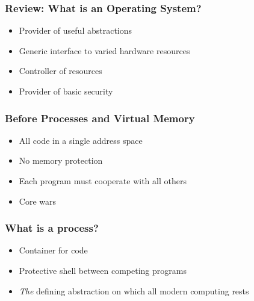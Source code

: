 \documentclass[pdftex]{beamer} %
\begin{document}
\begin{frame}
  \frametitle{Review: What is an Operating System?}
  \begin{itemize}
  \item Provider of useful abstractions
  \item Generic interface to varied hardware resources
  \item Controller of resources
  \item Provider of basic security
  \end{itemize}
\end{frame}

\begin{frame}
  \frametitle{Before Processes and Virtual Memory}
  \begin{itemize}
  \item All code in a single address space
  \item No memory protection
  \item Each program must cooperate with all others
  \item Core wars
  \end{itemize}
\end{frame}

\begin{frame}
  \frametitle{What is a process?}
  \begin{itemize}
  \item Container for code
  \item Protective shell between competing programs
  \item \emph{The} defining abstraction on which all modern computing rests
  \end{itemize}
\end{frame}
\end{document}
